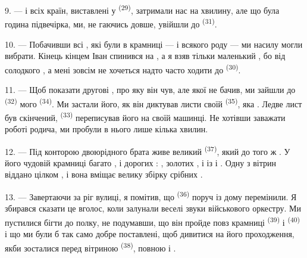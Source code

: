 \VUsaut{3.0mm}

9. ---  і  всіх країн, виставлені у
  \textsuperscript{(29)}, затримали нас на
хвилину, але що була година підвечірка, ми, не гаючись довше, увійшли до
 \textsuperscript{(31)}.

10. --- Побачивши всі , які були в крамниці ---  і  всякого роду --- ми насилу могли вибрати.
Кінець кінцем Іван спинився на , а я взяв тільки
маленький , бо від солодкого ,
а мені зовсім не хочеться надто часто ходити до 
\textsuperscript{(30)}.

\VUsaut{3.0mm}

11. --- Щоб показати другові , про яку він чув, але
якої не бачив, ми зайшли до  \textsuperscript{(32)} мого
 \textsuperscript{(34)}. Ми застали його, як він
диктував листи своїй  \textsuperscript{(35)}, яка
. Ледве лист був скінчений, 
\textsuperscript{(33)} переписував його на своїй машинці. Не хотівши заважати
роботі родича, ми пробули в нього лише кілька хвилин.

12. --- Під конторою двоюрідного брата живе великий 
\textsuperscript{(37)}, який до того ж . У його чудовій крамниці
багато ,  і дорогих : , золотих ,  і  із
 і . Одну з вітрин віддано цілком
, і вона вміщає велику збірку срібних .

13. --- Завертаючи за ріг вулиці, я помітив, що 
\textsuperscript{(36)} поруч із  дому перемінили. Я збирався
сказати це вголос, коли залунали веселі звуки військового оркестру. Ми
пустилися бігти до полку, не подумавши, що він пройде повз крамниці
 \textsuperscript{(39)} і 
\textsuperscript{(40)} і що ми були б так само добре поставлені, щоб дивитися на
його проходження, якби зосталися перед вітриною 
\textsuperscript{(38)}, повною  і .

